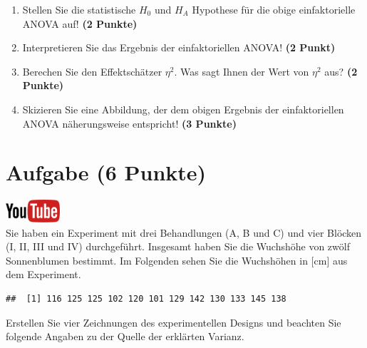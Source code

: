\documentclass[a4paper, 10pt]{scrartcl}\usepackage[]{graphicx}\usepackage[]{xcolor}
\makeatletter
\newenvironment{kframe}{%
 \def\at@end@of@kframe{}%
 \ifinner\ifhmode%
  \def\at@end@of@kframe{\end{minipage}}%
  \begin{minipage}{\columnwidth}%
 \fi\fi%
 \def\FrameCommand##1{\hskip\@totalleftmargin \hskip-\fboxsep
 \colorbox{shadecolor}{##1}\hskip-\fboxsep
     \hskip-\linewidth \hskip-\@totalleftmargin \hskip\columnwidth}%
 \MakeFramed {\advance\hsize-\width
   \@totalleftmargin\z@ \linewidth\hsize
   \@setminipage}}%
 {\par\unskip\endMakeFramed%
 \at@end@of@kframe}
\newenvironment{knitrout}{}{} %
\makeatother
\begin{document}
\begin{enumerate}
\item Stellen Sie die statistische $H_0$ und $H_A$ Hypothese f{\"u}r die obige
  einfaktorielle ANOVA auf! \textbf{(2 Punkte)}
\item Interpretieren Sie das Ergebnis der einfaktoriellen ANOVA! \textbf{(2 Punkt)} 
\item Berechen Sie den Effektsch{\"a}tzer $\eta^2$. Was sagt Ihnen der Wert von
  $\eta^2$ aus? \textbf{(2 Punkte)}
\item Skizieren Sie eine Abbildung, der dem obigen Ergebnis der
  einfaktoriellen ANOVA n{\"a}herungsweise entspricht! \textbf{(3 Punkte)}
\end{enumerate}

 
\clearpage

\section{Aufgabe \hfill (6 Punkte)}

\hfill\href{https://youtu.be/zDK2dhgtFt0}{\includegraphics[width =
  2cm]{img/youtube}}\\[1Ex]


Sie haben ein Experiment mit drei Behandlungen (A, B und C) und vier
Bl{\"o}cken (I, II, III und IV) durchgef{\"u}hrt. Insgesamt haben Sie die Wuchsh{\"o}he
von zw{\"o}lf Sonnenblumen bestimmt. Im Folgenden sehen Sie die Wuchsh{\"o}hen in
[cm] aus dem Experiment.


\begin{knitrout}
\color{fgcolor}\begin{kframe}
\begin{verbatim}
##  [1] 116 125 125 102 120 101 129 142 130 133 145 138
\end{verbatim}
\end{kframe}
\end{knitrout}

Erstellen Sie vier Zeichnungen des experimentellen Designs und beachten
Sie folgende Angaben zu der Quelle der erkl{\"a}rten Varianz. 
\end{document}
